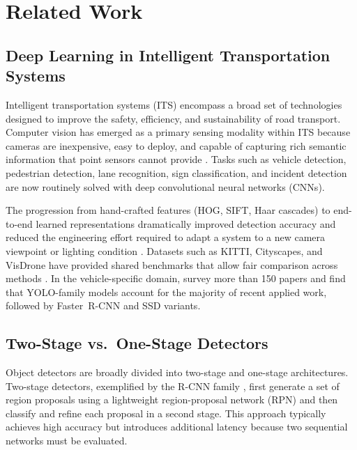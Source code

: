 \section{Related Work}
\label{sec:related_work}

\subsection{Deep Learning in Intelligent Transportation Systems}

Intelligent transportation systems (ITS) encompass a broad set of technologies
designed to improve the safety, efficiency, and sustainability of road transport.
Computer vision has emerged as a primary sensing modality within ITS because cameras
are inexpensive, easy to deploy, and capable of capturing rich semantic information
that point sensors cannot provide \cite{dilek2023sensors}.
Tasks such as vehicle detection, pedestrian detection, lane recognition, sign
classification, and incident detection are now routinely solved with deep
convolutional neural networks (CNNs).

The progression from hand-crafted features (HOG, SIFT, Haar cascades) to end-to-end
learned representations dramatically improved detection accuracy and reduced the
engineering effort required to adapt a system to a new camera viewpoint or lighting
condition \cite{liu2020deep}.
Datasets such as KITTI, Cityscapes, and VisDrone have provided shared benchmarks that
allow fair comparison across methods \cite{geiger2012kitti,zhu2021visdrone}.
In the vehicle-specific domain, \citet{berwo2023sensors} survey more than 150 papers
and find that YOLO-family models account for the majority of recent applied work,
followed by Faster~R-CNN and SSD variants.

\subsection{Two-Stage vs.\ One-Stage Detectors}

Object detectors are broadly divided into two-stage and one-stage architectures.
Two-stage detectors, exemplified by the R-CNN family \cite{ren2015faster}, first generate
a set of region proposals using a lightweight region-proposal network (RPN) and then
classify and refine each proposal in a second stage.
This approach typically achieves high accuracy but introduces additional latency
because two sequential networks must be evaluated.

